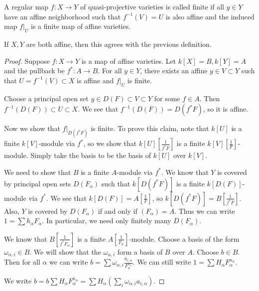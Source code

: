 \documentclass[twoside, 10pt]{article}
\begin{document}
    \begin{defn}
        A regular map $f:X \to Y$ of quasi-projective varieties is called finite if all $y \in Y$ have an affine neighborhood such that $f^{-1}(V) = U$ is also affine and the induced map $f\vert_U$ is a finite map of affine varieties.
    \end{defn}

    \begin{prop}
        If $X, Y$ are both affine, then this agrees with the previous definition.
        \begin{proof}
            Suppose $f:X \to Y$ is a map of affine varieties. Let $k[X] = B, k[Y] = A$ and the pullback be $f^*:A \to B$. For all $y \in Y$, there exists an affine $y \in V \subset Y$ such that $U = f^{-1}(V) \subset X$ is affine and $f|_U$ is finite.

        Choose a principal open set $y \in D(F) \subset V \subset Y$ for some $f \in A$. Then $f^{-1}(D(F)) \subset U \subset X$. We see that $f^{-1}(D(F)) = D(f^*F)$, so it is affine.

        Now we show that $f\vert_{D(f^*F)}$ is finite. To prove this claim, note that $k[U]$ is a finite $k[V]$-module via $f^*$, so we show that $k[U][\frac{1}{f^*F}]$ is a finite $k[V][\frac{1}{F}]$-module. Simply take the basis to be the basis of $k[U]$ over $k[V]$.

        We need to show that $B$ is a finite $A$-module via $f^*$. We know that $Y$ is covered by principal open sets $D(F_{\alpha})$ such that $k[D(f^*F)]$ is a finite $k[D(F)]$-module via $f^*$. We see that $k[D(F)] = A[\frac{1}{F}]$, so $k[D(f^*F)] = B[\frac{1}{f^*F}]$. Also, $Y$ is covered by $D(F_{\alpha})$ if and only if $(F_{\alpha}) = A$. Thus we can write $1 = \sum h_{\alpha}F_{\alpha}$. In particular, we need only finitely many $D(F_{\alpha})$.

        We know that $B[\frac{1}{f^*F_{\alpha}}]$ is a finite $A[\frac{1}{F_{\alpha}}]$-module. Choose a basis of the form $\omega_{\alpha, i} \in B$. We will show that the $\omega_{\alpha, i}$ form a basis of $B$ over $A$. Choose $b \in B$. Then for all $\alpha$ we can write $b = \sum \omega_{\alpha, i} \frac{a_{i, \alpha}}{F_{\alpha}^{n_{\alpha}}}$. We can still write $1 = \sum H_{\alpha}F_{\alpha}^{n_{\alpha}}$.

        We write $b = b \sum H_{\alpha}F_{\alpha}^{n_{\alpha}} = \sum H_{\alpha}(\sum_i \omega_{\alpha, i}a_{i,\alpha})$. 
        \end{proof}
    \end{prop}
    
\end{document}
